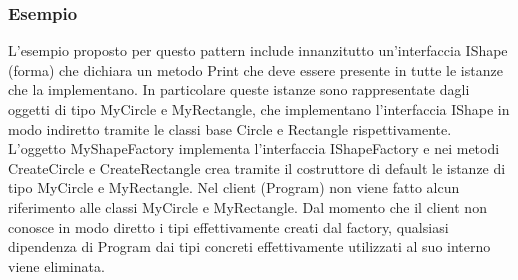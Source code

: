\documentclass[a4paper,10pt]{article}
\begin{document}
                    \newpage
                    \subsubsection{Esempio}
                    L’esempio proposto per questo pattern include innanzitutto un’interfaccia IShape (forma) che dichiara un metodo Print che deve essere presente in tutte le istanze che la implementano. In particolare queste istanze sono rappresentate dagli oggetti di tipo MyCircle e MyRectangle, che implementano l’interfaccia IShape in modo indiretto tramite le classi base Circle e Rectangle rispettivamente. L’oggetto MyShapeFactory implementa l’interfaccia IShapeFactory e nei metodi CreateCircle e CreateRectangle crea tramite il costruttore di default le istanze di tipo MyCircle e MyRectangle. Nel client (Program) non viene fatto alcun riferimento alle classi MyCircle e MyRectangle. Dal momento che il client non conosce in modo diretto i tipi effettivamente creati dal factory, qualsiasi dipendenza di Program dai tipi concreti effettivamente utilizzati al suo interno viene eliminata.
\end{document}
